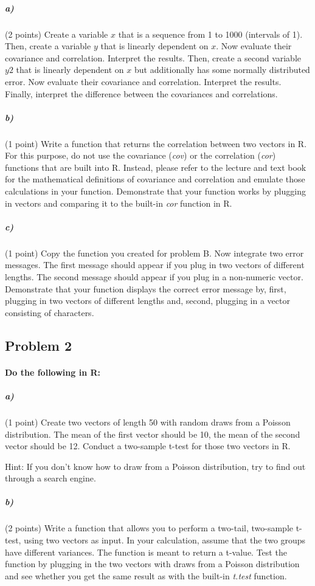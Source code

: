 \documentclass[12pt,letter]{article}
\begin{document}
\subparagraph{a)} (2 points) Create a variable $x$ that is a sequence from 1 to 1000 (intervals of 1). Then, create a variable $y$ that is linearly dependent on $x$. Now evaluate their covariance and correlation. Interpret the results. Then, create a second variable $y2$ that is linearly dependent on $x$ but additionally has some normally distributed error. Now evaluate their covariance and correlation. Interpret the results. Finally, interpret the difference between the covariances and correlations.

\subparagraph{b)} (1 point) Write a function that returns the correlation between two vectors in R. For this purpose, do not use the covariance (\textit{cov}) or the correlation (\textit{cor}) functions that are built into R. Instead, please refer to the lecture and text book for the mathematical definitions of covariance and correlation and emulate those calculations in your function. Demonstrate that your function works by plugging in vectors and comparing it to the built-in \textit{cor} function in R.

\subparagraph{c)} (1 point) Copy the function you created for problem B. Now integrate two error messages. The first message should appear if you plug in two vectors of different lengths. The second message should appear if you plug in a non-numeric vector. Demonstrate that your function displays the correct error message by, first, plugging in two vectors of different lengths and, second, plugging in a vector consisting of characters.



\subsection*{Problem 2}

\paragraph{Do the following in R:}

\subparagraph{a)} (1 point) Create two vectors of length 50 with random draws from a Poisson distribution. The mean of the first vector should be 10, the mean of the second vector should be 12. Conduct a two-sample t-test for those two vectors in R.

Hint: If you don't know how to draw from a Poisson distribution, try to find out through a search engine.

\subparagraph{b)} (2 points) Write a function that allows you to perform a two-tail, two-sample t-test, using two vectors as input. In your calculation, assume that the two groups have different variances. The function is meant to return a t-value. Test the function by plugging in the two vectors with draws from a Poisson distribution and see whether you get the same result as with the built-in \textit{t.test} function.
\end{document}
